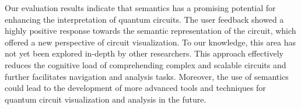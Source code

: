 Our evaluation results indicate that semantics has a promising potential for enhancing the interpretation of quantum circuits.
The user feedback showed a highly positive response towards the semantic representation of the circuit,
which offered a new perspective of circuit visualization.
To our knowledge, this area has not yet been explored in-depth by other researchers. 
This approach effectively reduces the cognitive load of comprehending complex and scalable circuits and further facilitates navigation and analysis tasks.
Moreover, the use of semantics could lead to the development of more advanced tools and techniques for quantum circuit visualization and analysis in the future.

